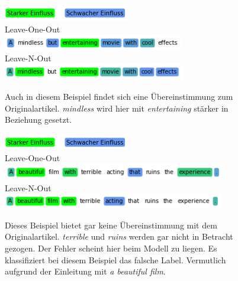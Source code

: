\documentclass[DIV=13,fontsize=11pt]{scrartcl}
\begin{document}
\begin{figure}[H]
    \centering
    \includegraphics[]{img/legend.png}\\
    Leave-One-Out\\
    \includegraphics[]{img/third_ex_loo.png}\\
    Leave-N-Out\\
    \includegraphics[]{img/third_ex_lno.png}
    \caption{Auch in diesem Beispiel findet sich eine Übereinstimmung zum Originalartikel. \textit{mindless} wird hier mit \textit{entertaining} stärker in Beziehung gesetzt.}
    \label{fig:ex3}
\end{figure}

\begin{figure}[H]
    \centering
    \includegraphics[]{img/legend.png}\\
    Leave-One-Out\\
    \includegraphics[]{img/fourth_ex_loo.png}\\
    Leave-N-Out\\
    \includegraphics[]{img/fourth_ex_lno.png}
    \caption{Dieses Beispiel bietet gar keine Übereinstimmung mit dem Originalartikel. \textit{terrible} und \textit{ruins} werden gar nicht in Betracht gezogen. Der Fehler scheint hier beim Modell zu liegen. Es klassifiziert bei diesem Beispiel das falsche Label. Vermutlich aufgrund der Einleitung mit \textit{a beautiful film}.}
    \label{fig:ex4}
\end{figure}
\end{document}
